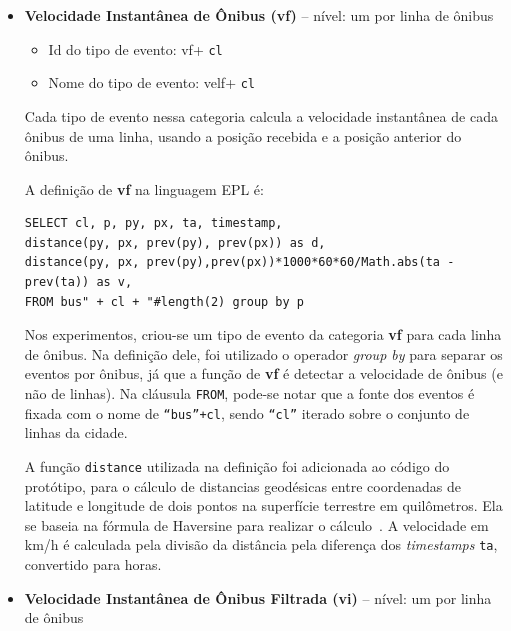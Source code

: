 \begin{itemize}    
    \item \textbf{Velocidade Instantânea de Ônibus (vf)} -- nível: um por linha de ônibus
    \begin{itemize}
        \item  Id do tipo de evento: vf+ \texttt{cl}%
        \item Nome do tipo de evento: velf+ \texttt{cl}%
    \end{itemize}
   
    
    
    Cada tipo de evento nessa categoria calcula a velocidade instantânea de cada ônibus de uma linha, usando a posição recebida e a posição anterior do ônibus. %
    
    A definição de \textbf{vf} na linguagem EPL é:
\begin{verbatim}
SELECT cl, p, py, px, ta, timestamp, 
distance(py, px, prev(py), prev(px)) as d,
distance(py, px, prev(py),prev(px))*1000*60*60/Math.abs(ta - prev(ta)) as v,
FROM bus" + cl + "#length(2) group by p 
\end{verbatim}

    Nos experimentos, criou-se um tipo de evento da categoria \textbf{vf} para cada linha de ônibus. Na definição dele, foi utilizado o operador \textit{group by} para separar os eventos por ônibus, já que a função de \textbf{vf} é detectar a velocidade de ônibus (e não de linhas). Na cláusula \texttt{FROM}, pode-se notar que a fonte dos eventos é fixada com o nome de \texttt{``bus''+cl}, sendo \texttt{``cl''} iterado sobre o conjunto de linhas da cidade. 
    
    A função \texttt{distance} utilizada na definição foi adicionada ao código do protótipo, para o cálculo de distancias geodésicas entre coordenadas de latitude e longitude de dois pontos na superfície terrestre em quilômetros. Ela se baseia na fórmula de Haversine para realizar o cálculo~\citep{Haversine}. A velocidade em km/h é calculada pela divisão da distância pela diferença dos \textit{timestamps} \texttt{ta}, convertido para horas.
 
    \item \textbf{Velocidade Instantânea de Ônibus Filtrada (vi)}  -- nível: um por linha de ônibus
    

\end{itemize}
